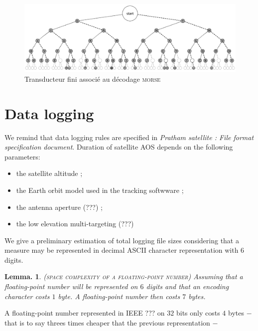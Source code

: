 \documentclass[a4paper]{report}
\newtheorem{proposition}[theorem]{Lemma.}
\newenvironment{remark}[1][Remark.]{\begin{trivlist}
\item[\hskip \labelsep {\bfseries #1}]}{\end{trivlist}}
\begin{document}
\begin{figure}
  \includegraphics[width=17cm]{pictures/Morse_code_tree3.png}
\caption{Transducteur fini associ\'e au d\'ecodage \textsc{morse}~\cite{copyright_transducteur_morse}}
\label{fig:transducteur_morse}
\end{figure}

\section{Data logging}

We remind that data logging rules are specified in \textit{Pratham satellite : File format specification document}\cite{IITB_filespec}. Duration of satellite AOS depends on the following parameters:

\begin{itemize}
\item{the satellite altitude ;}
\item{the Earth orbit model used in the tracking softwware ;}
\item{the antenna aperture (???) ;}
\item{the low elevation multi-targeting (???)}
\end{itemize}

We give a preliminary estimation of total logging file sizes considering that a measure may be represented in decimal ASCII character representation with 6 digits.

\begin{proposition}
  (\textsc{space complexity of a floating-point number})
  Assuming that a floating-point number will be represented on $6$ digits and that an encoding character costs $1$ byte. A floating-point number then costs $7$ bytes.
\end{proposition}

\begin{remark}
  A floating-point number represented in IEEE ??? on $32$ bits only costs $4$ bytes $-$ that is to say threes times cheaper that the previous representation $-$
\end{remark}
\end{document}
